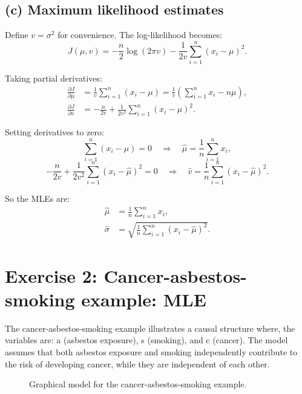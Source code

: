 \documentclass[11pt]{article}
\begin{document}
\subsection*{(c) Maximum likelihood estimates}

Define $v = \sigma^2$ for convenience. The log-likelihood becomes:
\[
J(\mu, v) = -\frac{n}{2} \log(2\pi v) - \frac{1}{2v} \sum_{i=1}^n (x_i - \mu)^2.
\]

Taking partial derivatives:
\begin{align}
\frac{\partial J}{\partial \mu} &= \frac{1}{v} \sum_{i=1}^n (x_i - \mu) = \frac{1}{v} \left( \sum_{i=1}^n x_i - n\mu \right), \\
\frac{\partial J}{\partial v} &= -\frac{n}{2v} + \frac{1}{2v^2} \sum_{i=1}^n (x_i - \mu)^2.
\end{align}

Setting derivatives to zero:
\[
\sum_{i=1}^n (x_i - \mu) = 0 \quad \Rightarrow \quad \hat{\mu} = \frac{1}{n} \sum_{i=1}^n x_i,
\]
\[
-\frac{n}{2v} + \frac{1}{2v^2} \sum_{i=1}^n (x_i - \hat{\mu})^2 = 0 \quad \Rightarrow \quad \hat{v} = \frac{1}{n} \sum_{i=1}^n (x_i - \hat{\mu})^2.
\]

So the MLEs are:
\begin{align}
\hat{\mu} &= \frac{1}{n} \sum_{i=1}^n x_i, \\
\hat{\sigma} &= \sqrt{ \frac{1}{n} \sum_{i=1}^n (x_i - \hat{\mu})^2 }.
\end{align}
\fi

\section*{Exercise 2: Cancer-asbestos-smoking example: MLE}

The cancer-asbestos-smoking example illustrates a causal structure where,
the variables are: a (asbestos exposure), s (smoking), and c (cancer).
The model assumes that both asbestos exposure and smoking independently contribute to the risk of developing cancer, while they are independent of each other.

\begin{figure}[h]
\centering
{}
\caption{Graphical model for the cancer-asbestos-smoking example.}
\end{figure}
\end{document}
